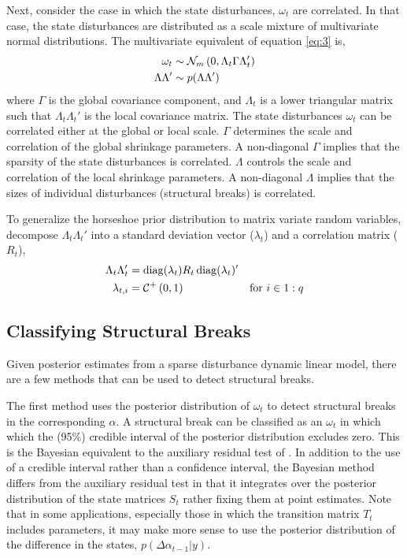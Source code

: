 \documentclass{article}
\begin{document}
Next, consider the case in which the state disturbances, $\omega_{t}$ are correlated.
In that case, the state disturbances are distributed as a scale mixture of multivariate normal distributions.
The multivariate equivalent of equation \eqref{eq:3} is,
\begin{equation}
  \begin{aligned}[t]
    \omega_{t} &\sim \dmvnorm{0, \Lambda_{t} \Gamma \Lambda_{t}'}{m} \\
    \Lambda \Lambda' & \sim p(\Lambda \Lambda')
  \end{aligned}
\end{equation}
where $\Gamma$ is the global covariance component, and $\Lambda_{t}$ is a lower triangular matrix such that  $\Lambda_{t} \Lambda_{t}'$ is the local covariance matrix.
The state disturbances $\omega_{t}$ can be correlated either at the global or local scale.
$\Gamma$ determines the scale and correlation of the global shrinkage parameters.
A non-diagonal $\Gamma$ implies that the sparsity of the state disturbances is correlated.
$\Lambda$ controls the scale and correlation of the local shrinkage parameters.
A non-diagonal $\Lambda$ implies that the sizes of individual disturbances (structural breaks) is correlated.

To generalize the horseshoe prior distribution to matrix variate random variables, decompose $\Lambda_{t} \Lambda_{t}'$ into a standard deviation vector ($\lambda_{t}$) and a correlation matrix ($R_{t}$),%
\begin{align}
  \label{eq:16}
  \Lambda_{t} \Lambda_{t}' &= \diag(\lambda_{t}) R_{t} \diag(\lambda_{t})' \\
  \label{eq:17}
  \lambda_{t,i} &= \dhalfcauchy{0, 1} & \text{for $i \in 1:q$}
\end{align}

\subsection{Classifying Structural Breaks}
\label{sec:structural-breaks}

Given posterior estimates from a sparse disturbance dynamic linear model, there are a few methods that can be used to detect structural breaks.

The first method uses the posterior distribution of $\omega_{t}$ to detect structural breaks in the corresponding $\alpha$.
A structural break can be classified as an $\omega_{t}$ in which which the (95\%) credible interval of the posterior distribution excludes zero.
This is the Bayesian equivalent to the auxiliary residual test of \textcites{JongPenzer1998}{DurbinKoopman2001}.%
In addition to the use of a credible interval rather than a confidence interval, the Bayesian method differs from the auxiliary residual test in that it integrates over the posterior distribution of the state matrices $S_{t}$ rather fixing them at point estimates.
Note that in some applications, especially those in which the transition matrix $T_{t}$ includes parameters, it may make more sense to use the posterior distribution of the difference in the states, $p(\Delta \alpha_{t - 1} | y)$.
\end{document}
